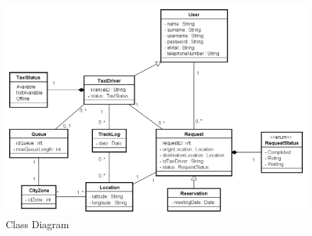 \begin{figure}[H]
    \includegraphics[width=\textwidth]{./Diagrams/ClassDiagram.png}
    \caption{Class Diagram}
\end{figure}